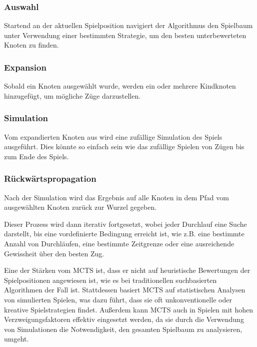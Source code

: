 \subsubsection{Auswahl}
Startend an der aktuellen Spielposition navigiert der Algorithmus den Spielbaum unter Verwendung einer bestimmten Strategie, 
um den besten unterbewerteten Knoten zu finden.~\cite{Ziad_Salloum_2019_towardsdatascience}

\subsubsection{Expansion}
Sobald ein Knoten ausgewählt wurde, werden ein oder mehrere Kindknoten hinzugefügt, um mögliche Züge darzustellen.~\cite{Ziad_Salloum_2019_towardsdatascience}

\subsubsection{Simulation}
Vom expandierten Knoten aus wird eine zufällige Simulation des Spiels ausgeführt. Dies könnte so einfach sein wie das zufällige 
Spielen von Zügen bis zum Ende des Spiels.~\cite{Ziad_Salloum_2019_towardsdatascience}

\subsubsection{Rückwärtspropagation}
Nach der Simulation wird das Ergebnis auf alle Knoten in dem Pfad vom ausgewählten Knoten zurück zur Wurzel gegeben.

Dieser Prozess wird dann iterativ fortgesetzt, wobei jeder Durchlauf eine Suche darstellt, bis eine vordefinierte Bedingung erreicht ist, 
wie z.B. eine bestimmte Anzahl von Durchläufen, eine bestimmte Zeitgrenze oder eine ausreichende Gewissheit über den besten Zug.

Eine der Stärken vom \ac{MCTS} ist, dass er nicht auf heuristische Bewertungen der Spielpositionen angewiesen ist, 
wie es bei traditionellen suchbasierten Algorithmen der Fall ist. Stattdessen basiert \ac{MCTS} auf statistischen Analysen von simulierten Spielen, 
was dazu führt, dass sie oft unkonventionelle oder kreative Spielstrategien findet. Außerdem kann \ac{MCTS} auch in Spielen mit hohen 
Verzweigungsfaktoren effektiv eingesetzt werden, da sie durch die Verwendung von Simulationen die Notwendigkeit, 
den gesamten Spielbaum zu analysieren, umgeht.~\cite{Ziad_Salloum_2019_towardsdatascience}

